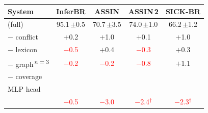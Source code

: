 \begin{tabular*}{\textwidth}{@{\extracolsep{\fill}}lcccc@{}}
\toprule
System & InferBR & ASSIN & ASSIN\,2 & SICK-BR \\
\midrule
\model{} (full) & 95.1\,{\tiny$\pm$0.5} & 70.7\,{\tiny$\pm$3.5} & 74.0\,{\tiny$\pm$1.0} & 66.2\,{\tiny$\pm$1.2} \\
$-$ conflict & $+$0.2 & $+$1.0 & $+$0.1 & $+$1.0 \\
$-$ lexicon & \textcolor{red}{$-$0.5} & $+$0.4 & \textcolor{red}{$-$0.3} & $+$0.3 \\
$-$ graph\textsuperscript{\,$n{=}3$} & \textcolor{red}{$-$0.2} & \textcolor{red}{$-$0.2} & \textcolor{red}{$-$0.8} & $+$1.1 \\
$-$ coverage &  &  &  &  \\
MLP head &  &  &  &  \\
\midrule
\cls{} & \textcolor{red}{$-$0.5} & \textcolor{red}{$-$3.0} & \textcolor{red}{$-$2.4$^{\dagger}$} & \textcolor{red}{$-$2.3$^{\dagger}$} \\
\bottomrule
\end{tabular*}
